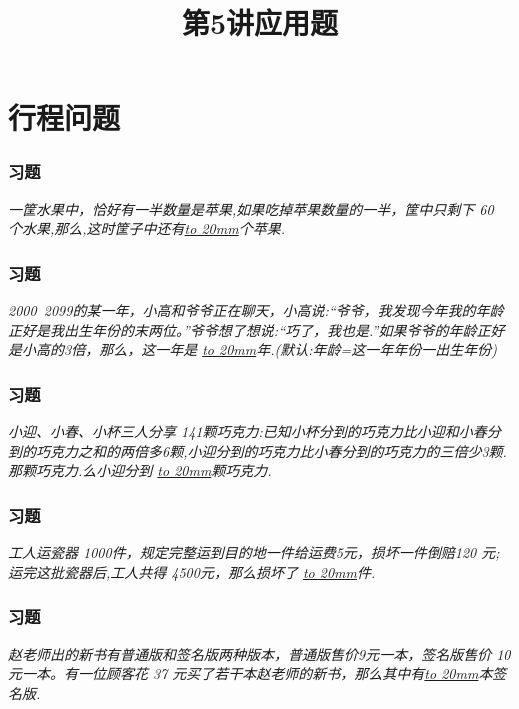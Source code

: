 \section{行程问题}

\title[第5讲\quad 应用题]{第5讲\quad 应用题} 
\author{}
\date{}

\begin{frame}
    \titlepage
\end{frame}

\setcounter{framecounter}{0}

\begin{frame}
    \frametitle{习题\theframecounter}
    \textit{一筐水果中，恰好有一半数量是苹果,如果吃掉苹果数量的一半，筐中只剩下 60 个水果,那么,这时筐子中还有\underline{\hbox to 20mm{}}个苹果.} 
\end{frame}


\begin{frame}
    \frametitle{习题\theframecounter}
    \textit{2000~2099的某一年，小高和爷爷正在聊天，小高说:“爷爷，我发现今年我的年龄正好是我出生年份的末两位。”爷爷想了想说:“巧了，我也是.”如果爷爷的年龄正好是小高的3倍，那么，这一年是  \underline{\hbox to 20mm{}}年.(默认:年龄=这一年年份一出生年份)} 
\end{frame}


\begin{frame}
    \frametitle{习题\theframecounter}
    \textit{小迎、小春、小杯三人分享 141颗巧克力:已知小杯分到的巧克力比小迎和小春分到的巧克力之和的两倍多6颗,小迎分到的巧克力比小春分到的巧克力的三倍少3颗.那颗巧克力.么小迎分到  \underline{\hbox to 20mm{}}颗巧克力.} 
\end{frame}

\begin{frame}
    \frametitle{习题\theframecounter}
    \textit{工人运瓷器 1000件，规定完整运到目的地一件给运费5元，损坏一件倒赔120 元;运完这批瓷器后,工人共得 4500元，那么损坏了 \underline{\hbox to 20mm{}}件.} 
\end{frame}

\begin{frame}
    \frametitle{习题\theframecounter}
    \textit{赵老师出的新书有普通版和签名版两种版本，普通版售价9元一本，签名版售价 10 元一本。有一位顾客花 37 元买了若干本赵老师的新书，那么其中有\underline{\hbox to 20mm{}}本签名版.} 
\end{frame}

